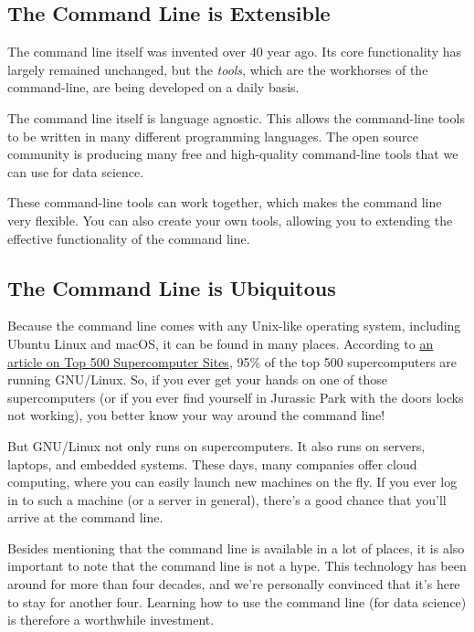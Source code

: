 \documentclass[
]{book}
\theoremstyle{definition}
\theoremstyle{definition}
\theoremstyle{definition}
\theoremstyle{remark}
\begin{document}
\hypertarget{the-command-line-is-extensible}{%
\subsection{The Command Line is Extensible}\label{the-command-line-is-extensible}}

The command line itself was invented over 40 year ago. Its core functionality has largely remained unchanged, but the \emph{tools}, which are the workhorses of the command-line, are being developed on a daily basis.

The command line itself is language agnostic. This allows the command-line tools to be written in many different programming languages. The open source community is producing many free and high-quality command-line tools that we can use for data science.

These command-line tools can work together, which makes the command line very flexible. You can also create your own tools, allowing you to extending the effective functionality of the command line.

\hypertarget{the-command-line-is-ubiquitous}{%
\subsection{The Command Line is Ubiquitous}\label{the-command-line-is-ubiquitous}}

Because the command line comes with any Unix-like operating system, including Ubuntu Linux and macOS, it can be found in many places. According to \href{http://top500.org/blog/lists/2013/11/press-release}{an article on Top 500 Supercomputer Sites}, 95\% of the top 500 supercomputers are running GNU/Linux. So, if you ever get your hands on one of those supercomputers (or if you ever find yourself in Jurassic Park with the doors locks not working), you better know your way around the command line!

But GNU/Linux not only runs on supercomputers. It also runs on servers, laptops, and embedded systems. These days, many companies offer cloud computing, where you can easily launch new machines on the fly. If you ever log in to such a machine (or a server in general), there's a good chance that you'll arrive at the command line.

Besides mentioning that the command line is available in a lot of places, it is also important to note that the command line is not a hype. This technology has been around for more than four decades, and we're personally convinced that it's here to stay for another four. Learning how to use the command line (for data science) is therefore a worthwhile investment.
\end{document}
